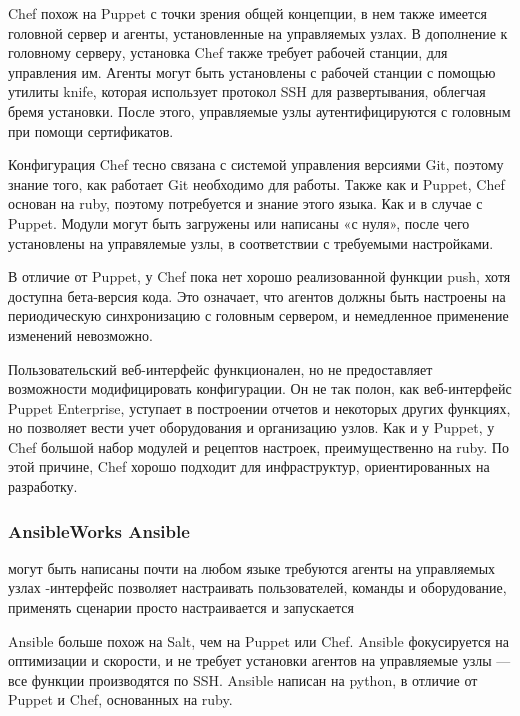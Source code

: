 \documentclass{../industrial-development}
\begin{document}
\lecturenotes
Chef похож на Puppet с точки зрения общей концепции, в нем также имеется головной сервер и агенты, установленные на управляемых узлах. В дополнение к головному серверу, установка Chef также требует рабочей станции, для управления им. Агенты могут быть установлены с рабочей станции с помощью утилиты knife, которая использует протокол SSH для развертывания, облегчая бремя установки. После этого, управляемые узлы аутентифицируются с головным при помощи сертификатов.

Конфигурация Chef тесно связана с системой управления версиями Git, поэтому знание того, как работает Git необходимо для работы. Также как и Puppet, Chef основан на ruby, поэтому потребуется и знание этого языка. Как и в случае с Puppet. Модули могут быть загружены или написаны «с нуля», после чего установлены на управялемые узлы, в соответствии с требуемыми настройками.

В отличие от Puppet, у Chef пока нет хорошо реализованной функции push, хотя доступна бета-версия кода. Это означает, что агентов должны быть настроены на периодическую синхронизацию с головным сервером, и немедленное применение изменений невозможно.

Пользовательский веб-интерфейс функционален, но не предоставляет возможности модифицировать конфигурации. Он не так полон, как веб-интерфейс Puppet Enterprise, уступает в построении отчетов и некоторых других функциях, но позволяет вести учет оборудования и организацию узлов.
Как и у Puppet, у Chef большой набор модулей и рецептов настроек, преимущественно на ruby. По этой причине, Chef хорошо подходит для инфраструктур, ориентированных на разработку.
~\cite{Instruments}
\begin{frame} \frametitle{AnsibleWorks Ansible}
  
  \begin{itemize}
 могут быть написаны почти на любом языке
 требуются агенты на управляемых узлах
-интерфейс позволяет настраивать пользователей, команды и оборудование, применять сценарии
 просто настраивается и запускается

  \end{itemize}
\end{frame}

\lecturenotes
Ansible больше похож на Salt, чем на Puppet или Chef. Ansible фокусируется на оптимизации и скорости, и не требует установки агентов на управляемые узлы — все функции производятся по SSH. Ansible написан на python, в отличие от Puppet и Chef, основанных на ruby.
\end{document}

